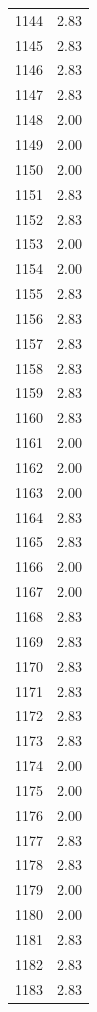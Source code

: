 \documentclass[a4paper,11pt]{article}
\begin{document}
\begin{center}
\begin{longtable}{|R{1.5cm}|R{2.5cm}|}
 1144  &         2.83 \\ 
 1145  &         2.83 \\ 
 1146  &         2.83 \\ 
 1147  &         2.83 \\ 
 1148  &         2.00 \\ 
 1149  &         2.00 \\ 
 1150  &         2.00 \\ 
 1151  &         2.83 \\ 
 1152  &         2.83 \\ 
 1153  &         2.00 \\ 
 1154  &         2.00 \\ 
 1155  &         2.83 \\ 
 1156  &         2.83 \\ 
 1157  &         2.83 \\ 
 1158  &         2.83 \\ 
 1159  &         2.83 \\ 
 1160  &         2.83 \\ 
 1161  &         2.00 \\ 
 1162  &         2.00 \\ 
 1163  &         2.00 \\ 
 1164  &         2.83 \\ 
 1165  &         2.83 \\ 
 1166  &         2.00 \\ 
 1167  &         2.00 \\ 
 1168  &         2.83 \\ 
 1169  &         2.83 \\ 
 1170  &         2.83 \\ 
 1171  &         2.83 \\ 
 1172  &         2.83 \\ 
 1173  &         2.83 \\ 
 1174  &         2.00 \\ 
 1175  &         2.00 \\ 
 1176  &         2.00 \\ 
 1177  &         2.83 \\ 
 1178  &         2.83 \\ 
 1179  &         2.00 \\ 
 1180  &         2.00 \\ 
 1181  &         2.83 \\ 
 1182  &         2.83 \\ 
 1183  &         2.83 \\ 

\end{longtable}
\end{center}
\end{document}
